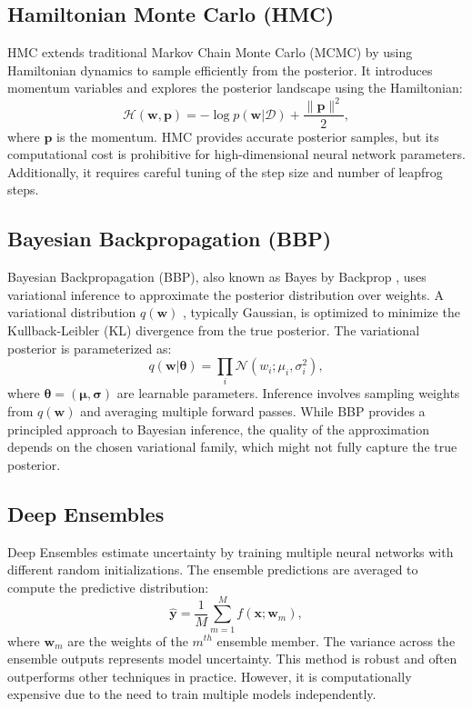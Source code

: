 \documentclass{article}
\begin{document}
\subsection{Hamiltonian Monte Carlo (HMC)}
HMC \cite{neal12} extends traditional Markov Chain Monte Carlo (MCMC) by using Hamiltonian dynamics to sample efficiently from the posterior. It introduces momentum variables and explores the posterior landscape using the Hamiltonian:
$$
\mathcal{H}(\mathbf{w}, \mathbf{p}) = -\log p(\mathbf{w} | \mathcal{D}) + \frac{\|\mathbf{p}\|^2}{2},
$$
where  $\mathbf{p}$  is the momentum. HMC provides accurate posterior samples, but its computational cost is prohibitive for high-dimensional neural network parameters. Additionally, it requires careful tuning of the step size and number of leapfrog steps.

\subsection{Bayesian Backpropagation (BBP)}
Bayesian Backpropagation (BBP), also known as Bayes by Backprop \cite{blundell15}, uses variational inference to approximate the posterior distribution over weights. A variational distribution  $q(\mathbf{w})$ , typically Gaussian, is optimized to minimize the Kullback-Leibler (KL) divergence from the true posterior. The variational posterior is parameterized as:
$$
q(\mathbf{w} | \boldsymbol{\theta}) = \prod_{i} \mathcal{N}(w_i; \mu_i, \sigma_i^2),
$$
where  $\boldsymbol{\theta} = (\boldsymbol{\mu}, \boldsymbol{\sigma})$  are learnable parameters. Inference involves sampling weights from  $q(\mathbf{w})$  and averaging multiple forward passes. While BBP provides a principled approach to Bayesian inference, the quality of the approximation depends on the chosen variational family, which might not fully capture the true posterior.

\subsection{Deep Ensembles}
Deep Ensembles \cite{NIPS2017} estimate uncertainty by training multiple neural networks with different random initializations. The ensemble predictions are averaged to compute the predictive distribution:
$$
\hat{\mathbf{y}} = \frac{1}{M} \sum_{m=1}^{M} f(\mathbf{x}; \mathbf{w}_m),
$$
where  $\mathbf{w}_m$  are the weights of the  $m^{th}$ ensemble member. The variance across the ensemble outputs represents model uncertainty. This method is robust and often outperforms other techniques in practice. However, it is computationally expensive due to the need to train multiple models independently.
\end{document}
